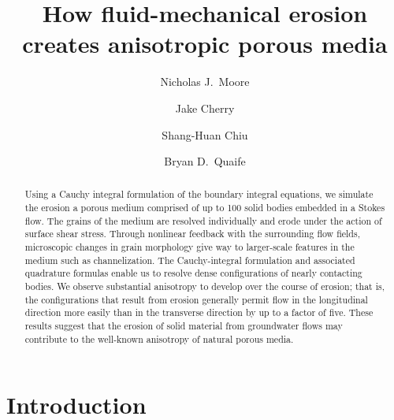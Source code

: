 \documentclass[3p]{elsarticle}
\begin{document}
\title{How fluid-mechanical erosion creates anisotropic porous media}



\author[Colgate]{Nicholas J.~Moore}

\author[FSU]{Jake Cherry}

\author[NJIT]{Shang-Huan Chiu}

\author[FSU]{Bryan D.~Quaife}

\address[Colgate]{Colgate University}
\address[FSU]{Florida State University}
\address[NJIT]{New Jersey Institute of Technology}

\begin{abstract}
Using a Cauchy integral formulation of the boundary integral equations, we simulate the erosion a porous medium comprised of up to 100 solid bodies embedded in a Stokes flow. The grains of the medium are resolved individually and erode under the action of surface shear stress. Through nonlinear feedback with the surrounding flow fields, microscopic changes in grain morphology give way to larger-scale features in the medium such as channelization. The Cauchy-integral formulation and associated quadrature formulas enable us to resolve dense configurations of nearly contacting bodies.
We observe substantial anisotropy to develop over the course of erosion; that is, the configurations that result from erosion generally permit flow in the longitudinal direction more easily than in the transverse direction by up to a factor of five. These results suggest that the erosion of solid material from groundwater flows may contribute to the well-known anisotropy of natural porous media.
\end{abstract}
\maketitle



\section{Introduction}
\end{document}
